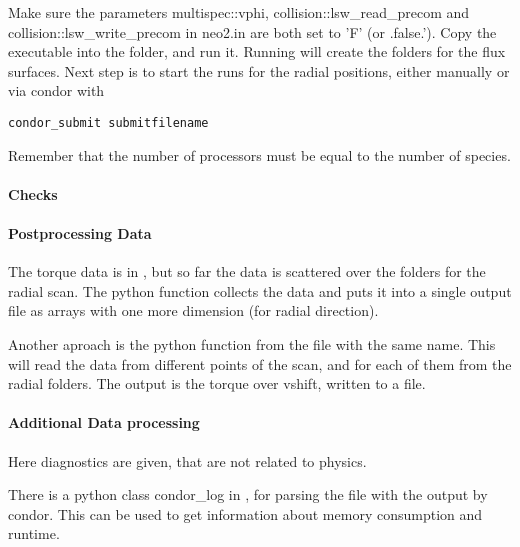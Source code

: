 Make sure the parameters multispec::vphi, collision::lsw\_read\_precom
and collision::lsw\_write\_precom in neo2.in are both set to 'F' (or
.false.').
Copy the \neotwo executable into the folder, and run it. Running \neotwo
will create the folders for the flux surfaces.
Next step is to start the runs for the radial
positions, either manually or via condor with
\begin{verbatim}
condor_submit submitfilename
\end{verbatim}

Remember that the number of processors must be equal to the number of
species.


\paragraph{Checks}

\paragraph{Postprocessing Data}
The torque data is in , but so far the
data is scattered over the folders for the radial scan.
The python function  collects the data
and puts it into a single output file as arrays with one more dimension
(for radial direction).

Another aproach is the python function  from
the file with the same name. This will read the data from different
points of the scan, and for each of them from the radial folders. The
output is the torque over vshift, written to a file.

\paragraph{Additional Data processing}
Here diagnostics are given, that are not related to physics.

There is a python class condor\_log in
, for parsing the file with the output
by condor. This can be used to get information about memory consumption
and runtime.



